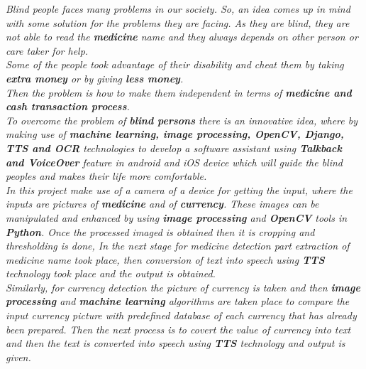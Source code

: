 \abstract

\textit{Blind people faces many problems in our society. So, an idea comes up in mind with some solution for the problems they are facing. As they are blind, they are not able to read the \textbf{\textit{medicine}} name and they always depends on other person or care taker for help.\\Some of the people took advantage of their disability and cheat them by taking \textbf{\textit{extra money}} or by giving \textbf{\textit{less money}}.\\Then the problem is how to make them independent in terms of \textbf{\textit{medicine and cash transaction} process}.\\To overcome the problem of \textbf{\textit{blind persons}} there is an innovative idea, where by making use of \textbf{\textit{machine learning, image processing, OpenCV, Django, TTS and OCR}} technologies to develop a software assistant using \textbf{\textit{Talkback and VoiceOver}} feature in android and iOS device which will guide the blind peoples and makes their life more comfortable.\\In this project make use of a camera of a device for getting the input, where the inputs are pictures of \textbf{\textit{medicine}} and of \textbf{\textit{currency}}. These images can be manipulated and enhanced by using \textbf{\textit{image processing}} and  \textbf{\textit{OpenCV}} tools in \textbf{\textit{Python}}. Once the processed imaged is obtained then it is cropping and thresholding is done, In the next stage for medicine detection part extraction of medicine name took place, then conversion of text into speech using \textbf{\textit{TTS}} technology took place and the output is obtained.\\Similarly, for currency detection the picture of currency is taken and then \textbf{\textit{image processing}} and \textbf{\textit{machine learning}} algorithms are taken place to compare the input currency picture with predefined database of each currency that has already been prepared. Then the next process is to covert the value of currency into text and then the text is converted into speech using \textbf{\textit{TTS}} technology and output is given.}
